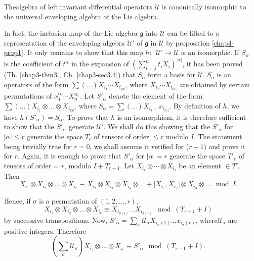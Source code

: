 \setcounter{thm}{0}
\begin{thm}\label{chap4-thm1}%
 {The\pageoriginale algebra of left invariant differential operators}
 $\mathcal{U}$ 
 {is canonically isomorphic to the universal enveloping algebra
   of the Lie algebra.} 
\end{thm}

In fact,  the inclusion map of the Lie algebra $\mathfrak{g}$ into
$\mathcal{U}$ can be lifted to a representation of the enveloping
algebra $\mathcal{U}'$ of $\mathfrak{g}$ in $\mathcal{U}$ by
proposition \ref{chap4-prop1}. It only remains to show that this map $h:~~
\mathcal{U}' \rightarrow \mathcal{U}$ is an isomorphic. If $S_\alpha$
is the coefficient of $t^\alpha$ in the expansion of
$(\sum\limits^{n}_{i=1}t_i X_i)^{|\alpha|}$, it has been proved
(Th. \ref{chap3-thm3}, Ch. \ref{chap3-sec3.4}) that $S_\alpha$ form a
basis for 
$\mathcal{U}$. $S_\alpha$ is an operators of the form
$\sum(\ldots)X_{i_1}\cdots X_{i_{|\alpha|}}$, where $X_{i_1}\cdots
X_{i_{|\alpha|}}$ are obtained by certain permutations of
$x^{\alpha_i}_{1}\cdots X^{\alpha_n}_{n}$. Let $S'_\alpha$ denote the
element of the form $\sum(\ldots)X_{i_1}\otimes \ldots \otimes
X_{i_{|\alpha|}}$, where $S_\alpha = \sum (\ldots) X_{i_1}\ldots
x_{i_{|\alpha|}}$. By definition of $h$, we  have $h(S'_\alpha)=S_\alpha$. To
prove that $h$ is an isomorphism, it is therefore sufficient to show
that the $S'_{\alpha}$ generate $\mathcal{U}'$. We shall do this
showing that the $ S'_\alpha $  for $|\alpha|\le r$ generate  the
space $T_r$ of tensors of order $\le r$ modulo $I$. The statement being
trivially true for $r=0$, we shall assume it verified for ($r-1)$ and
prove it for $r$. Again,  it is enough to prove that $S'_\alpha$ for
$|\alpha| = r$ generate the space $T'_r$ of tensors of order = $r$,
modulo $I+T_{r-1}$. Let $X_{i_1}\otimes \cdots \otimes X_{i_r}$ be an
element $\in T'_r$. Then 
$$
X_{i_1}\otimes X_{i_2} \otimes \ldots \otimes  X_{i_r}\equiv X_{i_2}
\otimes X_{i_1}\otimes X_{i_3} \otimes \ldots  +
\big[X_{i_1},X_{i_2}\big] \otimes X_{i_3}\otimes \ldots \mod  I. 
$$

Hence, if $\sigma$ is a permutation of $(1,2,\ldots,r)$,
$$  
X_{i_1}\otimes X_{i_2}\otimes \ldots \otimes X_{i_r} \equiv 
X_{i_{\sigma(1)}} \ldots X_{i_{\sigma(r)}} \mod (T_{r-1} + I) 
$$
by  successive transpositions. Now,
$S'_\alpha=\sum_{\sigma}\mathcal{U}_{\sigma} X_{i_\sigma(1)}\ldots
x_{i_\sigma(r)}$, where\pageoriginale $\mathcal{U}_\sigma$ are
positive integers. Therefore 
$$
(\sum\limits_{\sigma} \mathcal{U}_\sigma)X_{i_{1}} \otimes \ldots
\otimes X_{i_r}\equiv S'_\alpha \mod (T_{r-1} + I ). 
$$

